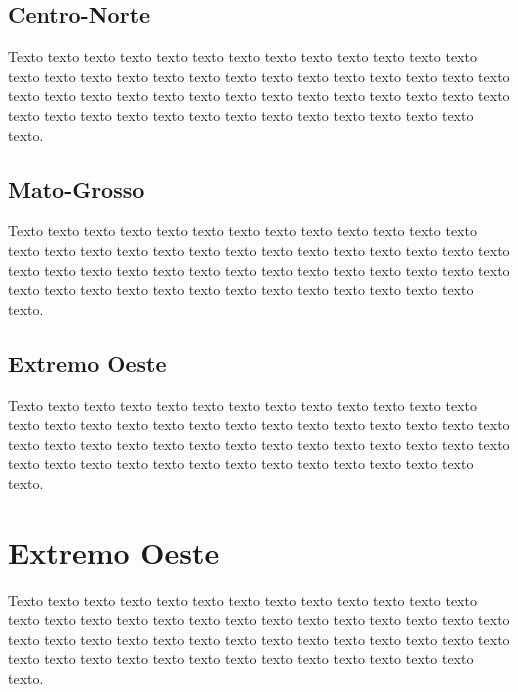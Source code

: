 \subsection{Centro-Norte}
\label{sec:fundamentos}

Texto texto texto texto texto texto texto texto texto texto texto texto texto
texto texto texto texto texto texto texto texto texto texto texto texto texto
texto texto texto texto texto texto texto texto texto texto texto texto texto
texto texto texto texto texto texto texto texto texto texto texto texto texto
texto texto texto.

\subsection{Mato-Grosso}
\label{sec:fundamentos}

Texto texto texto texto texto texto texto texto texto texto texto texto texto
texto texto texto texto texto texto texto texto texto texto texto texto texto
texto texto texto texto texto texto texto texto texto texto texto texto texto
texto texto texto texto texto texto texto texto texto texto texto texto texto
texto texto texto.

\subsection{Extremo Oeste}
\label{sec:fundamentos}

Texto texto texto texto texto texto texto texto texto texto texto texto texto
texto texto texto texto texto texto texto texto texto texto texto texto texto
texto texto texto texto texto texto texto texto texto texto texto texto texto
texto texto texto texto texto texto texto texto texto texto texto texto texto
texto texto texto.

\section{Extremo Oeste}
\label{sec:fundamentos}

Texto texto texto texto texto texto texto texto texto texto texto texto texto
texto texto texto texto texto texto texto texto texto texto texto texto texto
texto texto texto texto texto texto texto texto texto texto texto texto texto
texto texto texto texto texto texto texto texto texto texto texto texto texto
texto texto texto.



